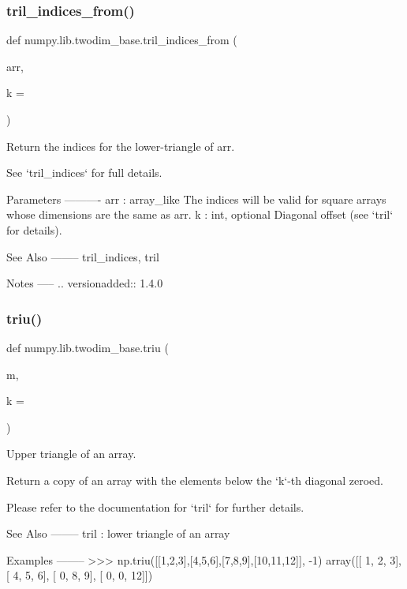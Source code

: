 \subsubsection{\texorpdfstring{tril\+\_\+indices\+\_\+from()}{tril\_indices\_from()}}
{\footnotesize\ttfamily def numpy.\+lib.\+twodim\+\_\+base.\+tril\+\_\+indices\+\_\+from (\begin{DoxyParamCaption}\item[{}]{arr,  }\item[{}]{k = {} }\end{DoxyParamCaption})}

\begin{DoxyVerb}Return the indices for the lower-triangle of arr.

See `tril_indices` for full details.

Parameters
----------
arr : array_like
    The indices will be valid for square arrays whose dimensions are
    the same as arr.
k : int, optional
    Diagonal offset (see `tril` for details).

See Also
--------
tril_indices, tril

Notes
-----
.. versionadded:: 1.4.0\end{DoxyVerb}
 \mbox{\label{namespacenumpy_1_1lib_1_1twodim__base_ad4c5f72467e0719ef3b6e8e9a1aad2cd}} 
\subsubsection{\texorpdfstring{triu()}{triu()}}
{\footnotesize\ttfamily def numpy.\+lib.\+twodim\+\_\+base.\+triu (\begin{DoxyParamCaption}\item[{}]{m,  }\item[{}]{k = {} }\end{DoxyParamCaption})}

\begin{DoxyVerb}Upper triangle of an array.

Return a copy of an array with the elements below the `k`-th diagonal
zeroed.

Please refer to the documentation for `tril` for further details.

See Also
--------
tril : lower triangle of an array

Examples
--------
>>> np.triu([[1,2,3],[4,5,6],[7,8,9],[10,11,12]], -1)
array([[ 1,  2,  3],
       [ 4,  5,  6],
       [ 0,  8,  9],
       [ 0,  0, 12]])\end{DoxyVerb}
 \mbox{\label{namespacenumpy_1_1lib_1_1twodim__base_ab3a38f5d340ce47aebc8046a4d7d57d7}} 
